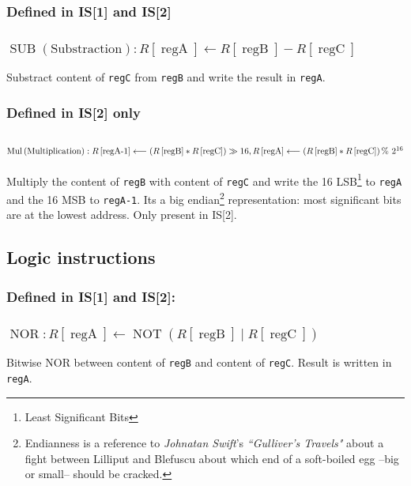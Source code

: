 \documentclass[10pt,a4paper]{article}
\theoremstyle{definition}%
\newcommand{\on}[1]{\operatorname{#1}}
\newcommand{\reg}[1]{\texttt{reg#1}}
\begin{document}
\subsubsection*{ Defined in IS[1] and IS[2]}
\subsubsection{$\on{SUB} \on{(Substraction)}: R\left[ \on{regA} \right] \longleftarrow  R\left[ \on{regB} \right] -  R\left[ \on{regC} \right]$}
Substract content of \reg{C} from \reg{B} and write the result in \reg{A}.

\subsubsection*{ Defined in IS[2] only}
\subsubsection{$\on{Mul} \on{(Multiplication)}: \newline R\left[ \on{regA-1} \right]\longleftarrow \left( R\left[ \on{regB} \right]*R\left[ \on{regC} \right]\right)\gg 16, \newline   R\left[ \on{regA} \right] \longleftarrow \left( R\left[ \on{regB} \right] *  R\left[ \on{regC} \right]\right) \% ~2^{16} $}
Multiply the content of \reg{B} with content of \reg{C} and write the 16 LSB\footnote{Least Significant Bits} to \reg{A} and the 16 MSB to \reg{A-1}. Its a big endian\footnote{Endianness is a reference to\textit{ Johnatan Swift}'s \textit{``Gulliver's Travels"} about a fight between Lilliput and Blefuscu about which end of a soft-boiled egg --big or small-- should be cracked.} representation: most significant bits are at the lowest address.
Only present in IS[2].

\subsection{Logic instructions}
\subsubsection*{ Defined in IS[1] and IS[2]:}
\subsubsection{$\on{NOR}: R\left[ \on{regA} \right] \longleftarrow   \on{NOT}\left( R\left[ \on{regB} \right] \mid R\left[ \on{regC} \right]\right) $}
Bitwise NOR between content of \reg{B} and content of \reg{C}. Result is written in \reg{A}.
\end{document}
